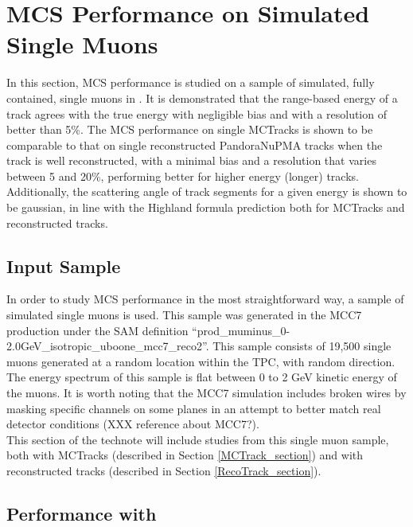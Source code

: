 
\section{MCS Performance on Simulated Single Muons}\label{singlemuon_MC_section}

In this section, MCS performance is studied on a sample of simulated, fully contained, single muons in {\ub}. It is demonstrated that the range-based energy of a track agrees with the true energy with negligible bias and with a resolution of better than 5\%. The MCS performance on single {\sc MCTracks} is shown to be comparable to that on single reconstructed PandoraNuPMA tracks when the track is well reconstructed, with a minimal bias and a resolution that varies between 5 and 20\%, performing better for higher energy (longer) tracks. Additionally, the scattering angle of track segments for a given energy is shown to be gaussian, in line with the Highland formula prediction both for {\sc MCTracks} and reconstructed tracks.


\subsection{Input Sample}\label{SingleMu_Input_Sample_section}
In order to study MCS performance in the most straightforward way, a sample of simulated single muons is used. This sample was generated in the {\ub} MCC7 production under the SAM definition ``prod\_muminus\_0-2.0GeV\_isotropic\_uboone\_mcc7\_reco2''. This sample consists of 19,500 single muons generated at a random location within the {\ub} TPC, with random direction. The energy spectrum of this sample is flat between 0 to 2 GeV kinetic energy of the muons. It is worth noting that the MCC7 simulation includes broken wires by masking specific channels on some planes in an attempt to better match real detector conditions (XXX reference about MCC7?).\\

This section of the technote will include studies from this single muon sample, both with {\sc MCTracks} (described in Section \ref{MCTrack_section}) and with reconstructed tracks (described in Section \ref{RecoTrack_section}).



\subsection{Performance with }


